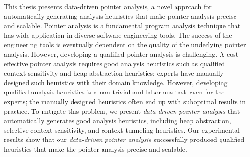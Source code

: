This thesis presents data-driven pointer analysis, a novel approach for automatically generating analysis heuristics that make pointer analysis precise and scalable. 
Pointer analysis is a fundamental program analysis technique that has wide application in diverse software engineering tools. The success of the engineering tools is eventually dependent on the quality of the underlying pointer analysis.
However, developing a qualified pointer analysis is challenging.
A cost-effective pointer analysis requires good analysis heuristics such as qualified context-sensitivity and heap abstraction heuristics; 
experts have manually designed such heuristics with their domain knowledge.
However, developing qualified analysis heuristics is a non-trivial and laborious task even for the experts; the manually designed heuristics often end up with suboptimal results in practice.
To mitigate this problem, we present {\em data-driven pointer analysis} that automatically generates good analysis heuristics, including heap abstraction, selective context-sensitivity, and context tunneling heuristics.
Our experimental results show that our {\em data-driven pointer analysis} successfully produced qualified heuristics that make the pointer analysis precise and scalable.









